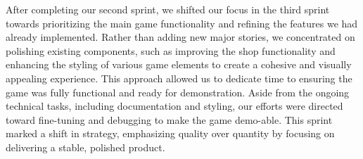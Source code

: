After completing our second sprint, we shifted our focus in the third sprint towards prioritizing the main game functionality and refining the features we had already implemented. Rather than adding new major stories, we concentrated on polishing existing components, such as improving the shop functionality and enhancing the styling of various game elements to create a cohesive and visually appealing experience. This approach allowed us to dedicate time to ensuring the game was fully functional and ready for demonstration. Aside from the ongoing technical tasks, including documentation and styling, our efforts were directed toward fine-tuning and debugging to make the game demo-able. This sprint marked a shift in strategy, emphasizing quality over quantity by focusing on delivering a stable, polished product.

\begin{table}[htbp]
\centering
{}
\caption{Delegation of user stories amongst group members for sprint 3}
\end{table}